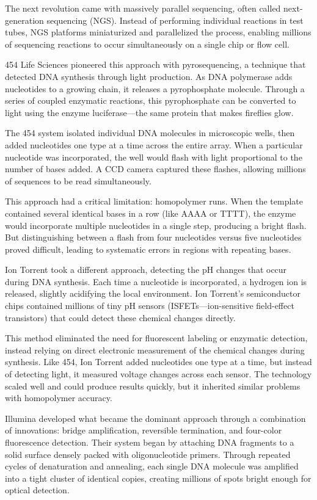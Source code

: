The next revolution came with massively parallel sequencing, often called next-generation sequencing (NGS). Instead of performing individual reactions in test tubes, NGS platforms miniaturized and parallelized the process, enabling millions of sequencing reactions to occur simultaneously on a single chip or flow cell.

454 Life Sciences pioneered this approach with pyrosequencing, a technique that detected DNA synthesis through light production. As DNA polymerase adds nucleotides to a growing chain, it releases a pyrophosphate molecule. Through a series of coupled enzymatic reactions, this pyrophosphate can be converted to light using the enzyme luciferase—the same protein that makes fireflies glow.

The 454 system isolated individual DNA molecules in microscopic wells, then added nucleotides one type at a time across the entire array. When a particular nucleotide was incorporated, the well would flash with light proportional to the number of bases added. A CCD camera captured these flashes, allowing millions of sequences to be read simultaneously.

This approach had a critical limitation: homopolymer runs. When the template contained several identical bases in a row (like AAAA or TTTT), the enzyme would incorporate multiple nucleotides in a single step, producing a bright flash. But distinguishing between a flash from four nucleotides versus five nucleotides proved difficult, leading to systematic errors in regions with repeating bases.

Ion Torrent took a different approach, detecting the pH changes that occur during DNA synthesis. Each time a nucleotide is incorporated, a hydrogen ion is released, slightly acidifying the local environment. Ion Torrent's semiconductor chips contained millions of tiny pH sensors (ISFETs—ion-sensitive field-effect transistors) that could detect these chemical changes directly.

This method eliminated the need for fluorescent labeling or enzymatic detection, instead relying on direct electronic measurement of the chemical changes during synthesis. Like 454, Ion Torrent added nucleotides one type at a time, but instead of detecting light, it measured voltage changes across each sensor. The technology scaled well and could produce results quickly, but it inherited similar problems with homopolymer accuracy.

Illumina developed what became the dominant approach through a combination of innovations: bridge amplification, reversible termination, and four-color fluorescence detection. Their system began by attaching DNA fragments to a solid surface densely packed with oligonucleotide primers. Through repeated cycles of denaturation and annealing, each single DNA molecule was amplified into a tight cluster of identical copies, creating millions of spots bright enough for optical detection.

